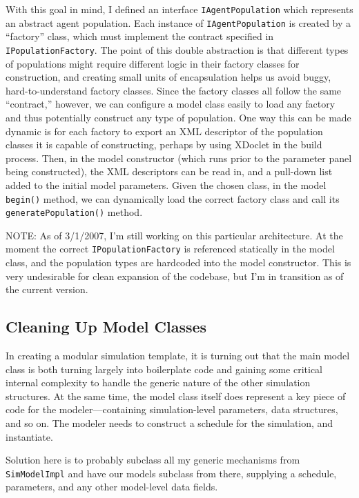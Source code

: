 \documentclass{kluwer-mem-copyright}
\begin{document}
\begin{article}
With this goal in mind, I defined an interface \texttt{IAgentPopulation} which
represents an abstract agent population.  Each instance of
\texttt{IAgentPopulation} is created by a ``factory'' class, which must
implement the contract specified in \texttt{IPopulationFactory}.  The point of
this double abstraction is that different types of populations might require
different logic in their factory classes for construction, and creating small
units of encapsulation helps us avoid buggy, hard-to-understand factory classes.
 Since the factory classes all follow the same ``contract,'' however, we can
 configure a model class easily to load any factory and thus potentially
 construct any type of population.  One way this can be made dynamic is for each
 factory to export an XML descriptor of the population classes it is capable of
 constructing, perhaps by using XDoclet in the build process.  Then, in the
 model constructor (which runs prior to the parameter panel being constructed),
 the XML descriptors can be read in, and a pull-down list added to the initial
 model parameters.  Given the chosen class, in the model \texttt{begin()}
 method, we can dynamically load the correct factory class and call its
 \texttt{generatePopulation()} method.  
 
 NOTE:  As of 3/1/2007, I'm still working on this particular architecture.  At
 the moment the correct \texttt{IPopulationFactory} is referenced statically in
 the model class, and the population types are hardcoded into the model
 constructor.  This is very undesirable for clean expansion of the codebase, but
 I'm in transition as of the current version.  

\subsection{Cleaning Up Model Classes}
In creating a modular simulation template, it is turning out that the main model
class is both turning largely into boilerplate code and gaining some critical
internal complexity to handle the generic nature of the other simulation
structures.  At the same time, the model class itself does represent a key piece
of code for the modeler---containing simulation-level parameters, data
structures, and so on.  The modeler needs to construct a schedule for the
simulation, and instantiate.  

Solution here is to probably subclass all my generic mechanisms from
\texttt{SimModelImpl} and have our models subclass from there, supplying a
schedule, parameters, and any other model-level data fields.


\end{article}
\end{document}
